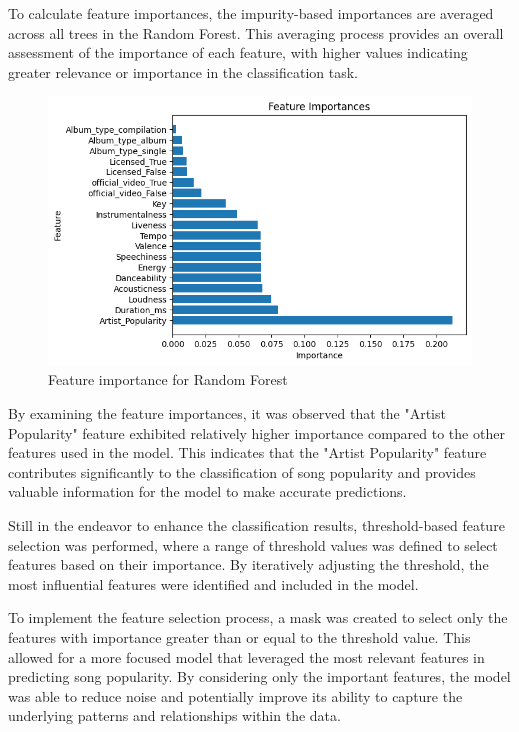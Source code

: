 \documentclass[11pt]{article} %
\begin{document}
To calculate feature importances, the impurity-based importances are averaged across all trees in the Random Forest. This averaging process provides an overall assessment of the importance of each feature, with higher values indicating greater relevance or importance in the classification task.

\begin{figure}[H]
	\centering
	\includegraphics[width=.8\linewidth]{feature_importance.png}
	\caption{Feature importance for Random Forest}\label{fig:feature_importance}
\end{figure}

By examining the feature importances, it was observed that the "Artist Popularity" feature exhibited relatively higher importance compared to the other features used in the model. This indicates that the "Artist Popularity" feature contributes significantly to the classification of song popularity and provides valuable information for the model to make accurate predictions.

\newblock

Still in the endeavor to enhance the classification results, threshold-based feature selection was performed, where a range of threshold values was defined to select features based on their importance. By iteratively adjusting the threshold, the most influential features were identified and included in the model.

To implement the feature selection process, a mask was created to select only the features with importance greater than or equal to the threshold value. This allowed for a more focused model that leveraged the most relevant features in predicting song popularity. By considering only the important features, the model was able to reduce noise and potentially improve its ability to capture the underlying patterns and relationships within the data.
\end{document}
